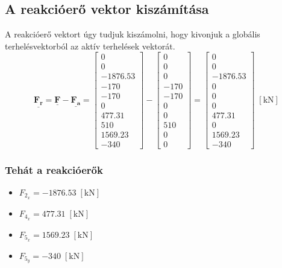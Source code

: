 \documentclass[12pt,a4paper]{article}
\def\vec#1{\underline{\mathbf{#1}}}
\def\kN{\; \left[\mathrm{kN}\right]}
\begin{document}
\subsection{A reakcióerő vektor kiszámítása}
A reakcióerő vektort úgy tudjuk kiszámolni, hogy kivonjuk a globális
terhelésvektorból az aktív terhelések vektorát.
\begin{equation}
    \vec{F_r}=\vec{F}-\vec{F_a}=
    \begin{bmatrix}
        0        \\
        0        \\
        -1876.53 \\
        -170     \\
        -170     \\
        0        \\
        477.31   \\
        510      \\
        1569.23  \\
        -340
    \end{bmatrix}-
    \begin{bmatrix}
        0    \\
        0    \\
        0    \\
        -170 \\
        -170 \\
        0    \\
        0    \\
        510  \\
        0    \\
        0
    \end{bmatrix}=
    \begin{bmatrix}
        0        \\
        0        \\
        -1876.53 \\
        0        \\
        0        \\
        0        \\
        477.31   \\
        0        \\
        1569.23  \\
        -340
    \end{bmatrix} \kN
\end{equation}
\subsubsection*{Tehát a reakcióerők}
\begin{multicols}{2}
    \begin{itemize}
        \item $F_{2_x}= -1876.53 \kN$
        \item $F_{4_x}=477.31 \kN$
    \end{itemize}
    \columnbreak
    \begin{itemize}
        \item $F_{5_x}= 1569.23 \kN$
        \item $F_{5_y}= -340 \kN$
    \end{itemize}
\end{multicols}
\end{document}
